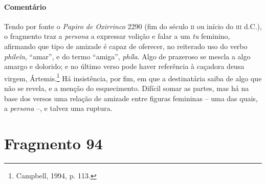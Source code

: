 \medskip

{\paragraph{Comentário} Tendo por fonte o \textit{Papiro de Oxirrinco} 2290 (fim do século \textsc{ii} ou início do \textsc{iii} d.C.), o fragmento traz a \textit{persona} a expressar volição e falar a um \textit{tu} feminino, afirmando que tipo de amizade é capaz de oferecer, no reiterado uso do verbo \textit{phileîn}, ``amar'', e do termo ``amiga'', \textit{phíla}. Algo de prazeroso se mescla a algo amargo e dolorido; e no último verso pode haver 
referência à caçadora deusa virgem, Ártemis.\footnote{Campbell, 1994, p. 113.} Há insistência, por fim, em que a destinatária saiba de algo que não se revela, e a menção do esquecimento. Difícil somar as partes, mas há na base dos versos  uma relação de amizade entre figuras femininas -- uma das quais, a \textit{persona} --, e talvez uma ruptura.}




\pagebreak
\section{Fragmento 94}

